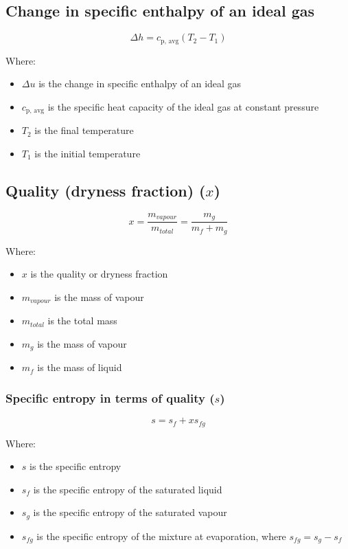 \documentclass[11pt]{article}
\begin{document}
\subsection{Change in specific enthalpy of an ideal gas}
\label{sec:orgee5e389}
\[\Delta h = c_{\text{p, avg}} (T_2 - T_1)\]

Where:
\begin{itemize}
\item \(\Delta u\) is the change in specific enthalpy of an ideal gas
\item \(c_{\text{p, avg}}\) is the specific heat capacity of the ideal gas at constant pressure
\item \(T_2\) is the final temperature
\item \(T_1\) is the initial temperature
\end{itemize}

\subsection{Quality (dryness fraction) (\(x\))}
\label{sec:org7707bf3}
\[x = \frac{m_{vapour}}{m_{total}} = \frac{m_g}{m_f + m_g}\]

Where:
\begin{itemize}
\item \(x\) is the quality or dryness fraction
\item \(m_{vapour}\) is the mass of vapour
\item \(m_{total}\) is the total mass
\item \(m_g\) is the mass of vapour
\item \(m_f\) is the mass of liquid
\end{itemize}

\subsubsection{Specific entropy in terms of quality (\(s\))}
\label{sec:org8036bda}
\[s = s_f + xs_{fg}\]

Where:
\begin{itemize}
\item \(s\) is the specific entropy
\item \(s_f\) is the specific entropy of the saturated liquid
\item \(s_g\) is the specific entropy of the saturated vapour
\item \(s_{fg}\) is the specific entropy of the mixture at evaporation, where \(s_{fg} = s_g - s_f\)
\end{itemize}
\end{document}
